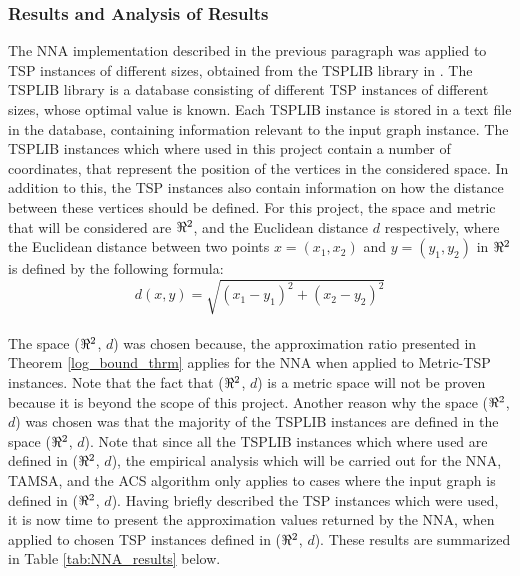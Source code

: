 \documentclass[12pt]{article}
\numberwithin{equation}{subsection}
\numberwithin{table}{subsection}
\numberwithin{algorithm}{subsection}
\numberwithin{figure}{subsection}
\begin{document}
\subsubsection{Results and Analysis of Results}
\label{NNA_analyze}
The NNA implementation described in the previous paragraph was applied to TSP instances of different sizes, obtained from the TSPLIB library in \cite{reinelt}. The TSPLIB library is a database consisting of different TSP instances of different sizes, whose optimal value is known. Each TSPLIB instance is stored in a text file in the database, containing information relevant to the input graph instance. The TSPLIB instances which where used in this project contain a number of coordinates, that represent the position of the vertices in the considered space. In addition to this, the TSP instances also contain information on how the distance between these vertices should be defined. For this project, the space and metric that will be considered are $\real^2$, and the Euclidean distance $d$ respectively, where the Euclidean distance between two points $x=(x_1, x_2)$ and $y=(y_1, y_2)$ in $\real^2$ is defined by the following formula: \\
\begin{equation}
  \label{metric_space}
  d(x,y) = \sqrt{(x_1-y_1)^2+(x_2-y_2)^2}
\end{equation}\\
The space ($\real^2$, $d$) was chosen because, the approximation ratio presented in Theorem \ref{log_bound_thrm} applies for the NNA when applied to Metric-TSP instances. Note that the fact that ($\real^2$, $d$) is a metric space will not be proven because it is beyond the scope of this project. Another reason why the space ($\real^2$, $d$) was chosen was that the majority of the TSPLIB instances are defined in the space ($\real^2$, $d$). Note that since all the TSPLIB instances which where used are defined in ($\real^2$, $d$), the empirical analysis which will be carried out for the NNA, TAMSA, and the ACS algorithm only applies to cases where the input graph is defined in ($\real^2$, $d$). Having briefly described the TSP instances which were used, it is now time to present the approximation values returned by the NNA, when applied to chosen TSP instances defined in ($\real^2$, $d$). These results are summarized in Table \ref{tab:NNA_results} below.
\end{document}
